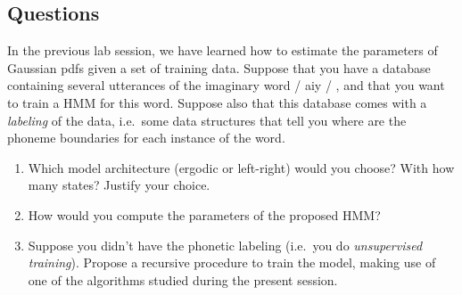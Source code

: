 \documentclass[11pt]{article}
\begin{document}
\subsection{Questions}
\label{sec:org7429e8e}
In the previous lab session, we have learned how to estimate the
parameters of Gaussian pdfs given a set of training data. Suppose that
you have a database containing several utterances of the imaginary
word / aiy / , and that you want to train a HMM for this word. Suppose also
that this database comes with a \emph{labeling} of the data, i.e. some data
structures that tell you where are the phoneme boundaries for each
instance of the word.
\begin{enumerate}
\item Which model architecture (ergodic or left-right)
would you choose? With how many states? Justify your choice.
\item How would you compute the parameters of the proposed HMM?
\item Suppose you didn't have the phonetic labeling (i.e. you do
\emph{unsupervised training}). Propose a recursive procedure to train
the model, making use of one of the algorithms studied during the
present session.
\end{enumerate}
\end{document}
